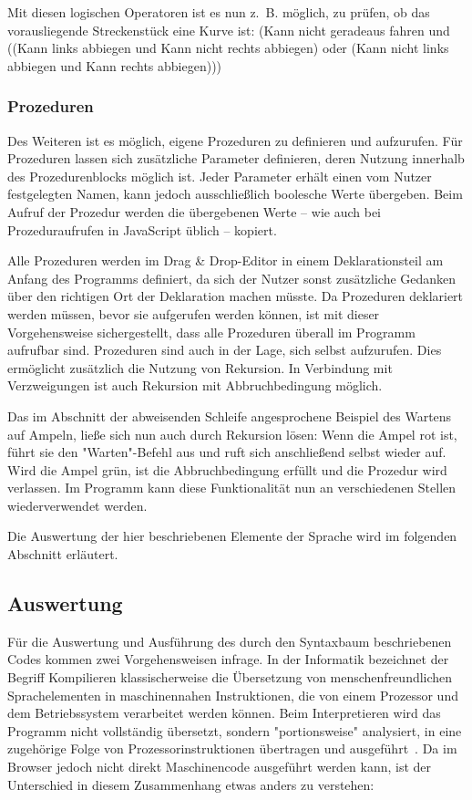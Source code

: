 Mit diesen logischen Operatoren ist es nun z.~B. möglich, zu prüfen, ob das vorausliegende Streckenstück eine Kurve ist: (Kann nicht geradeaus fahren und ((Kann links abbiegen und Kann nicht rechts abbiegen) oder (Kann nicht links abbiegen und Kann rechts abbiegen)))

\subsubsection{Prozeduren}
\label{sec:implementation:program:elements:proc}

Des Weiteren ist es möglich, eigene Prozeduren zu definieren und aufzurufen. Für Prozeduren lassen sich zusätzliche Parameter definieren, deren Nutzung innerhalb des Prozedurenblocks möglich ist. Jeder Parameter erhält einen vom Nutzer festgelegten Namen, kann jedoch ausschließlich boolesche Werte übergeben. Beim Aufruf der Prozedur werden die übergebenen Werte -- wie auch bei Prozeduraufrufen in JavaScript üblich -- kopiert.

Alle Prozeduren werden im Drag \& Drop-Editor in einem Deklarationsteil am Anfang des Programms definiert, da sich der Nutzer sonst zusätzliche Gedanken über den richtigen Ort der Deklaration machen müsste. Da Prozeduren deklariert werden müssen, bevor sie aufgerufen werden können, ist mit dieser Vorgehensweise sichergestellt, dass alle Prozeduren überall im Programm aufrufbar sind. Prozeduren sind auch in der Lage, sich selbst aufzurufen. Dies ermöglicht zusätzlich die Nutzung von Rekursion. In Verbindung mit Verzweigungen ist auch Rekursion mit Abbruchbedingung möglich.

Das im Abschnitt der abweisenden Schleife angesprochene Beispiel des Wartens auf Ampeln, ließe sich nun auch durch Rekursion lösen: Wenn die Ampel rot ist, führt sie den "Warten"-Befehl aus und ruft sich anschließend selbst wieder auf. Wird die Ampel grün, ist die Abbruchbedingung erfüllt und die Prozedur wird verlassen. Im Programm kann diese Funktionalität nun an verschiedenen Stellen wiederverwendet werden.

Die Auswertung der hier beschriebenen Elemente der Sprache wird im folgenden Abschnitt erläutert.

\subsection{Auswertung}
\label{sec:implementation:program:evaluation}

Für die Auswertung und Ausführung des durch den Syntaxbaum beschriebenen Codes kommen zwei Vorgehensweisen infrage. In der Informatik bezeichnet der Begriff Kompilieren klassischerweise die Übersetzung von menschenfreundlichen Sprachelementen in maschinennahen Instruktionen, die von einem Prozessor und dem Betriebssystem verarbeitet werden können. Beim Interpretieren wird das Programm nicht vollständig übersetzt, sondern "portionsweise" analysiert, in eine zugehörige Folge von Prozessorinstruktionen übertragen und ausgeführt~\cite[47]{wagenknecht2009}. Da im Browser jedoch nicht direkt Maschinencode ausgeführt werden kann, ist der Unterschied in diesem Zusammenhang etwas anders zu verstehen:

